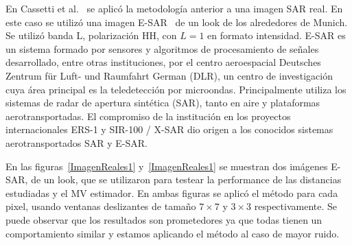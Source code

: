 En Cassetti et al.~\cite{APSAR2013ParameterEstimationStochasticDistances} se aplicó la metodología anterior a una imagen SAR real. En este caso se utilizó una imagen E-SAR~\cite{Horn1996} de un look de los alrededores de Munich. Se utilizó banda L, polarización HH, con $L=1$ en formato intensidad.
E-SAR es un sistema formado por sensores y algoritmos de procesamiento de señales desarrollado, entre otras instituciones, por el centro aeroespacial Deutsches Zentrum für Luft- und Raumfahrt German (DLR), un centro de investigación cuya área principal es la teledetección por microondas.  Principalmente utiliza los sistemas de radar de apertura sintética (SAR), tanto en aire y plataformas aerotransportadas. El compromiso de la institución en los proyectos internacionales ERS-1 y SIR-100 / X-SAR dio origen a los conocidos sistemas aerotransportados SAR y E-SAR. 

En las figuras~\ref{ImagenReales1} y~\ref{ImagenReales1} se muestran dos imágenes E-SAR, de un look, que se utilizaron para testear la performance de las distancias estudiadas y el MV estimador. En ambas figuras se aplicó el método para cada pixel, usando ventanas deslizantes de tamaño $7 \times 7$ y $3 \times 3$ respectivamente. Se puede observar que los resultados son prometedores ya que todas tienen un comportamiento similar y estamos aplicando el método al caso de mayor ruido.


